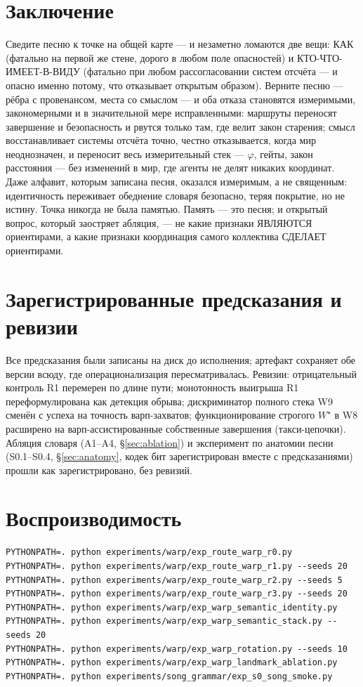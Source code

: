 \documentclass{article}
\newcommand{\wstar}{W^{\star}}
\begin{document}
\section{Заключение}

Сведите песню к точке на общей карте --- и незаметно ломаются две
вещи: КАК (фатально на первой же стене, дорого в любом поле
опасностей) и КТО-ЧТО-ИМЕЕТ-В-ВИДУ (фатально при любом рассогласовании
систем отсчёта --- и опасно именно потому, что отказывает открытым
образом). Верните песню --- рёбра с провенансом, места со смыслом ---
и оба отказа становятся измеримыми, закономерными и в значительной
мере исправленными: маршруты переносят завершение и безопасность и
рвутся только там, где велит закон старения; смысл восстанавливает
системы отсчёта точно, честно отказывается, когда мир неоднозначен, и
переносит весь измерительный стек --- $\varphi$, гейты, закон
расстояния --- без изменений в мир, где агенты не делят никаких
координат. Даже алфавит, которым записана песня, оказался измеримым,
а не священным: идентичность переживает обеднение словаря безопасно,
теряя покрытие, но не истину. Точка никогда не была памятью. Память
--- это песня; и открытый вопрос, который заостряет абляция, --- не
какие признаки ЯВЛЯЮТСЯ ориентирами, а какие признаки координация
самого коллектива СДЕЛАЕТ ориентирами.

\appendix

\section{Зарегистрированные предсказания и ревизии}
\label{app:registered}
Все предсказания были записаны на диск до исполнения; артефакт
сохраняет обе версии всюду, где операционализация пересматривалась.
Ревизии: отрицательный контроль R1 перемерен по длине пути;
монотонность выигрыша R1 переформулирована как детекция обрыва;
дискриминатор полного стека W9 сменён с успеха на точность
варп-захватов; функционирование строгого $\wstar$ в W8 расширено на
варп-ассистированные собственные завершения (такси-цепочки). Абляция
словаря (A1--A4, \S\ref{sec:ablation}) и эксперимент по анатомии песни
(S0.1--S0.4, \S\ref{sec:anatomy}, кодек бит зарегистрирован вместе с
предсказаниями) прошли как зарегистрировано, без ревизий.

\section{Воспроизводимость}
\label{app:repro}
\begin{verbatim}
PYTHONPATH=. python experiments/warp/exp_route_warp_r0.py
PYTHONPATH=. python experiments/warp/exp_route_warp_r1.py --seeds 20
PYTHONPATH=. python experiments/warp/exp_route_warp_r2.py --seeds 5
PYTHONPATH=. python experiments/warp/exp_route_warp_r3.py --seeds 20
PYTHONPATH=. python experiments/warp/exp_warp_semantic_identity.py
PYTHONPATH=. python experiments/warp/exp_warp_semantic_stack.py --seeds 20
PYTHONPATH=. python experiments/warp/exp_warp_rotation.py --seeds 10
PYTHONPATH=. python experiments/warp/exp_warp_landmark_ablation.py
PYTHONPATH=. python experiments/song_grammar/exp_s0_song_smoke.py
\end{verbatim}
\end{document}
